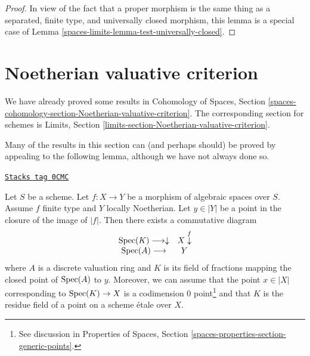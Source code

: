 \begin{proof}
In view of the fact that a proper morphism is the same thing as
a separated, finite type, and universally closed morphism, this
lemma is a special case of Lemma \ref{spaces-limits-lemma-test-universally-closed}.
\end{proof}

\section{Noetherian valuative criterion}
\label{spaces-limits-section-Noetherian-valuative-criterion}
We have already proved some results in Cohomology of Spaces, Section
\ref{spaces-cohomology-section-Noetherian-valuative-criterion}.
The corresponding section for schemes is
Limits, Section \ref{limits-section-Noetherian-valuative-criterion}.

\medskip\noindent
Many of the results in this section can (and perhaps should)
be proved by appealing to the following lemma, although we have not
always done so.

\begin{lemma}
\label{spaces-limits-lemma-reach-point-closure-Noetherian}
\href{https://stacks.math.columbia.edu/tag/0CMC}{\texttt{Stacks tag 0CMC}}

Let $S$ be a scheme. Let $f : X \to Y$ be a morphism of algebraic spaces
over $S$. Assume $f$ finite type and $Y$ locally Noetherian.
Let $y \in |Y|$ be a point in the closure of the image of $|f|$.
Then there exists a commutative diagram
$$
\begin{array}{cc}\operatorname{Spec}(K) \longrightarrow\downarrow & X \overset{f}{\downarrow} \\ \operatorname{Spec}(A) \longrightarrow & Y\end{array}
$$
where $A$ is a discrete valuation ring and $K$ is its field of fractions
mapping the closed point of $\operatorname{Spec}(A)$ to $y$. Moreover, we can assume
that the point $x \in |X|$ corresponding to $\operatorname{Spec}(K) \to X$ is a
codimension $0$ point\footnote{See discussion in
Properties of Spaces, Section \ref{spaces-properties-section-generic-points}.}
and that $K$ is the residue field of a point
on a scheme \'etale over $X$.
\end{lemma}


